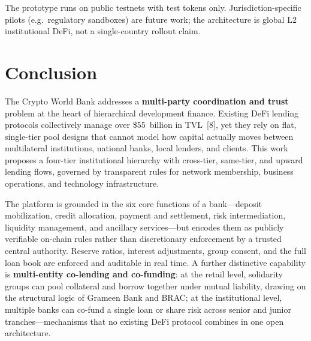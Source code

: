 \documentclass[12pt, a4paper]{report}
\begin{document}
The prototype runs on public testnets with test tokens only. Jurisdiction-specific pilots (e.g.\ regulatory sandboxes) are future work; the architecture is global L2 institutional DeFi, not a single-country rollout claim.


\chapter{Conclusion}

The Crypto World Bank addresses a \textbf{multi-party coordination and trust} problem at the heart of hierarchical development finance. Existing DeFi lending protocols collectively manage over \$55~billion in TVL~[8], yet they rely on flat, single-tier pool designs that cannot model how capital actually moves between multilateral institutions, national banks, local lenders, and clients. This work proposes a four-tier institutional hierarchy with cross-tier, same-tier, and upward lending flows, governed by transparent rules for network membership, business operations, and technology infrastructure.

The platform is grounded in the six core functions of a bank---deposit mobilization, credit allocation, payment and settlement, risk intermediation, liquidity management, and ancillary services---but encodes them as publicly verifiable on-chain rules rather than discretionary enforcement by a trusted central authority. Reserve ratios, interest adjustments, group consent, and the full loan book are enforced and auditable in real time. A further distinctive capability is \textbf{multi-entity co-lending and co-funding}: at the retail level, solidarity groups can pool collateral and borrow together under mutual liability, drawing on the structural logic of Grameen Bank and BRAC; at the institutional level, multiple banks can co-fund a single loan or share risk across senior and junior tranches---mechanisms that no existing DeFi protocol combines in one open architecture.
\end{document}
